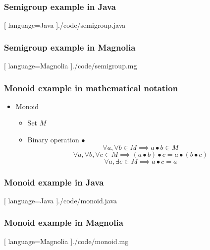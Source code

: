 \begin{frame}
    \frametitle{Semigroup example in Java}
    \begin{center}
      
      [ language=Java
      ]{./code/semigroup.java}
    \end{center}
\end{frame}

\begin{frame}
    \frametitle{Semigroup example in Magnolia}
    \begin{center}
      
      [ language=Magnolia
      ]{./code/semigroup.mg}
    \end{center}
\end{frame}

\begin{frame}
  \frametitle{Monoid example in mathematical notation}
  \begin{itemize}
    \item Monoid
    \begin{itemize}
      \item Set $M$
      \item Binary operation $\bullet$
      \begin{equation}
       \forall a, \forall b \in M \implies a \bullet b \in M
      \end{equation}
      \begin{equation}
        \forall a, \forall b, \forall c \in M \implies
        (a \bullet b) \bullet c = a \bullet (b \bullet c)
      \end{equation}
      \begin{equation}
        \forall a, \exists e \in M \implies a \bullet c = a
      \end{equation}
    \end{itemize}
  \end{itemize}
\end{frame}

\begin{frame}
    \frametitle{Monoid example in Java}
    \begin{center}
      
      [ language=Java
      ]{./code/monoid.java}
    \end{center}
\end{frame}

\begin{frame}
    \frametitle{Monoid example in Magnolia}
    \begin{center}
      
      [ language=Magnolia
      ]{./code/monoid.mg}
    \end{center}
\end{frame}

